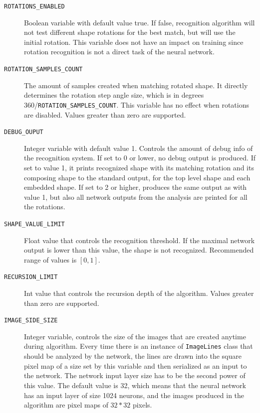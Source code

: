 \begin{description}
\item[\texttt{ROTATIONS\_ENABLED}] Boolean variable with default value true. If false, recognition algorithm will not test different shape rotations for the best match, but will use the initial rotation. This variable does not have an impact on training since rotation recognition is not a direct task of the neural network.

\item[\texttt{ROTATION\_SAMPLES\_COUNT}] The amount of samples created when matching rotated shape. It directly determines the rotation step angle size, which is in degrees 360/\texttt{ROTATION\_SAMPLES\_COUNT}. This variable has no effect when rotations are disabled. Values greater than zero are supported.

\item[\texttt{DEBUG\_OUPUT}] Integer variable with default value 1. Controls the amount of debug info of the recognition system. If set to 0 or lower, no debug output is produced. If set to value 1, it prints recognized shape with its matching rotation and its composing shape to the standard output, for the top level shape and each embedded shape. If set to 2 or higher, produces the same output as with value 1, but also all network outputs from the analysis are printed for all the rotations.

\item[\texttt{SHAPE\_VALUE\_LIMIT}] Float value that controls the recognition threshold. If the maximal network output is lower than this value, the shape is not recognized. Recommended range of values is $[0,1]$.

\item[\texttt{RECURSION\_LIMIT}] Int value that controls the recursion depth of the algorithm. Values greater than zero are supported.

\item[\texttt{IMAGE\_SIDE\_SIZE}] Integer variable, controls the size of the images that are created anytime during algorithm. Every time there is an instance of \texttt{ImageLines} class that should be analyzed by the network, the lines are drawn into the square pixel map of a size set by this variable and then serialized as an input to the network. The network input layer size has to be the second power of this value. The default value is 32, which means that the neural network has an input layer of size 1024 neurons, and the images produced in the algorithm are pixel maps of $32*32$ pixels.

\end{description}

